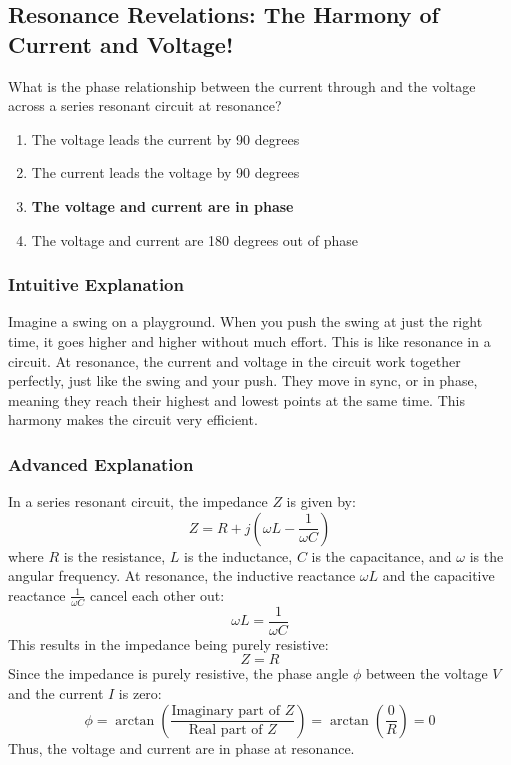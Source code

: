 \subsection{Resonance Revelations: The Harmony of Current and Voltage!}

\begin{tcolorbox}[colback=gray!10!white,colframe=black!75!black,title=E5A08] What is the phase relationship between the current through and the voltage across a series resonant circuit at resonance?
    \begin{enumerate}[label=\Alph*.]
        \item The voltage leads the current by 90 degrees
        \item The current leads the voltage by 90 degrees
        \item \textbf{The voltage and current are in phase}
        \item The voltage and current are 180 degrees out of phase
    \end{enumerate}
\end{tcolorbox}

\subsubsection*{Intuitive Explanation}
Imagine a swing on a playground. When you push the swing at just the right time, it goes higher and higher without much effort. This is like resonance in a circuit. At resonance, the current and voltage in the circuit work together perfectly, just like the swing and your push. They move in sync, or in phase, meaning they reach their highest and lowest points at the same time. This harmony makes the circuit very efficient.

\subsubsection*{Advanced Explanation}
In a series resonant circuit, the impedance \( Z \) is given by:
\[
Z = R + j\left(\omega L - \frac{1}{\omega C}\right)
\]
where \( R \) is the resistance, \( L \) is the inductance, \( C \) is the capacitance, and \( \omega \) is the angular frequency. At resonance, the inductive reactance \( \omega L \) and the capacitive reactance \( \frac{1}{\omega C} \) cancel each other out:
\[
\omega L = \frac{1}{\omega C}
\]
This results in the impedance being purely resistive:
\[
Z = R
\]
Since the impedance is purely resistive, the phase angle \( \phi \) between the voltage \( V \) and the current \( I \) is zero:
\[
\phi = \arctan\left(\frac{\text{Imaginary part of } Z}{\text{Real part of } Z}\right) = \arctan\left(\frac{0}{R}\right) = 0
\]
Thus, the voltage and current are in phase at resonance.

